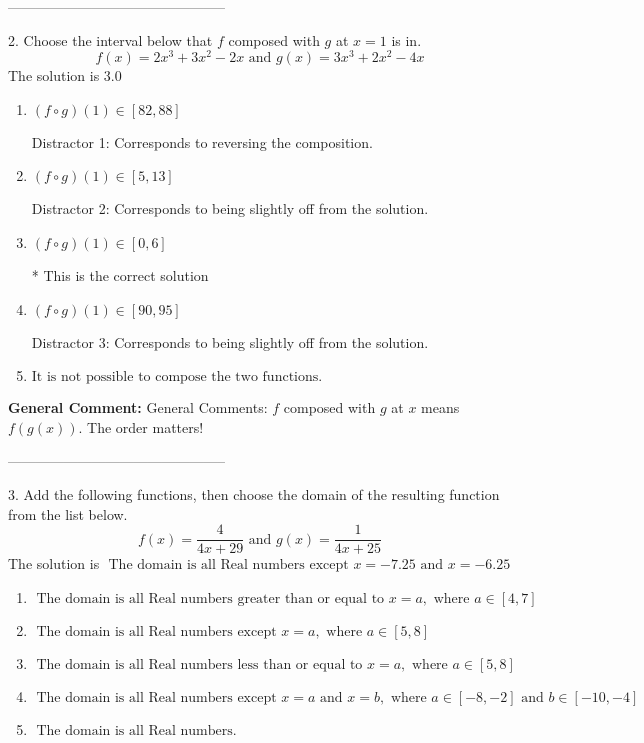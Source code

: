 \documentclass{extbook}[14pt]
\begin{document}
-----------------------------------------------

2. Choose the interval below that $f$ composed with $g$ at $x=1$ is in.
\[ f(x) = 2x^{3} +3 x^{2} -2 x \text{ and } g(x) = 3x^{3} +2 x^{2} -4 x \] 
The solution is $ 3.0 $ 

\begin{enumerate}[label=\Alph*.] 
\item $ (f \circ g)(1) \in [82, 88] $ 

  Distractor 1: Corresponds to reversing the composition. 
\item $ (f \circ g)(1) \in [5, 13] $ 

  Distractor 2: Corresponds to being slightly off from the solution. 
\item $ (f \circ g)(1) \in [0, 6] $ 

 * This is the correct solution 
\item $ (f \circ g)(1) \in [90, 95] $ 

  Distractor 3: Corresponds to being slightly off from the solution. 
\item $ \text{It is not possible to compose the two functions.} $ 

  
\end{enumerate} 
 
\textbf{General Comment:} General Comments: $f$ composed with $g$ at $x$ means $f(g(x))$. The order matters! 

-----------------------------------------------

3. Add the following functions, then choose the domain of the resulting function from the list below.
\[ f(x) = \frac{4}{4x+29} \text{ and } g(x) = \frac{1}{4x+25} \] 
The solution is $ \text{ The domain is all Real numbers except } x = -7.25 \text{ and } x = -6.25 $ 

\begin{enumerate}[label=\Alph*.] 
\item $ \text{ The domain is all Real numbers greater than or equal to } x = a, \text{ where } a \in [4, 7] $ 

  
\item $ \text{ The domain is all Real numbers except } x = a, \text{ where } a \in [5, 8] $ 

  
\item $ \text{ The domain is all Real numbers less than or equal to } x = a, \text{ where } a \in [5, 8] $ 

  
\item $ \text{ The domain is all Real numbers except } x = a \text{ and } x = b, \text{ where } a \in [-8, -2] \text{ and } b \in [-10, -4] $ 

  
\item $ \text{ The domain is all Real numbers. } $ 

  
\end{enumerate} 
 
\end{document}
